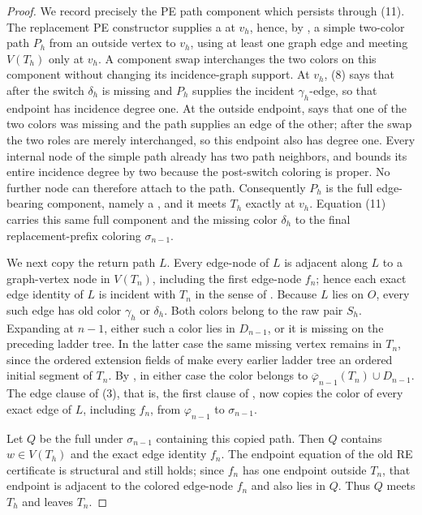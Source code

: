 \begin{proof}
We record precisely the PE path component which persists through (11).
The replacement PE constructor supplies a
 at \(v_h\), hence, by , a
simple two-color path \(P_h\) from an outside vertex to \(v_h\), using at
least one graph edge and meeting \(V(T_h)\) only at \(v_h\).  A component
swap interchanges the two colors on this component without changing its
incidence-graph support.  At \(v_h\), (8) says that after the switch
\(\delta_h\) is missing and \(P_h\) supplies the incident
\(\gamma_h\)-edge, so that endpoint has incidence degree one.  At the
outside endpoint,  says that one of the two colors
was missing and the path supplies an edge of the other; after the swap
the two roles are merely interchanged, so this endpoint also has degree
one.  Every internal node of the simple path already has two path
neighbors, and  bounds its
entire incidence degree by two because the post-switch coloring is
proper.  No further node can therefore attach to the path.  Consequently
\(P_h\) is the full edge-bearing component, namely a
, and it meets \(T_h\) exactly
at \(v_h\).  Equation (11) carries this same full component and the
missing color \(\delta_h\) to the final replacement-prefix coloring
\(\sigma_{n-1}\).

We next copy the return path \(L\).  Every edge-node of \(L\) is adjacent
along \(L\) to a graph-vertex node in \(V(T_n)\), including the first
edge-node \(f_n\); hence each exact edge identity of \(L\) is incident
with \(T_n\) in the sense of .  Because \(L\)
lies on \(O\), every such edge has old color \(\gamma_h\) or
\(\delta_h\).  Both colors belong to the raw pair \(S_h\).  Expanding
 at \(n-1\), either such a color lies in
\(D_{n-1}\), or it is missing on the preceding ladder tree.  In the
latter case the same missing vertex remains in \(T_n\), since the ordered
extension fields of  make every earlier
ladder tree an ordered initial segment of \(T_n\).  By
, in either case the color belongs to
\(\overline\varphi_{n-1}(T_n)\cup D_{n-1}\).  The edge clause of (3),
that is, the first clause of , now copies the
color of every exact edge of \(L\), including \(f_n\), from
\(\varphi_{n-1}\) to \(\sigma_{n-1}\).

Let \(Q\) be the full  under
\(\sigma_{n-1}\) containing this copied path.  Then \(Q\) contains
\(w\in V(T_h)\) and the exact edge identity \(f_n\).  The endpoint
equation of the old RE certificate is structural and still holds; since
\(f_n\) has one endpoint outside \(T_n\), that endpoint is adjacent to
the colored edge-node \(f_n\) and also lies in \(Q\).  Thus \(Q\) meets
\(T_h\) and leaves \(T_n\).


\end{proof}
